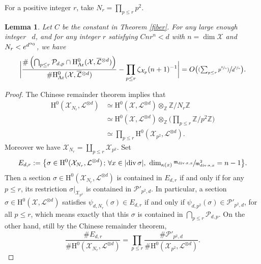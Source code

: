 \documentclass[11pt]{article}
\numberwithin{equation}{section}
\newcommand{\psfrac}[2]{\sfrac{(#1)}{#2}}
\newcommand{\sep}{\,;\,}
\theoremstyle{plain}
\newtheorem{lem}[thm]{Lemma}
\theoremstyle{definition}
\newcommand{\ho}{\mathrm{H}}
\newcommand{\m}{\mathfrak{m}}
\newcommand{\X}{\mathcal{X}}
\newcommand{\li}{\mathcal{L}}
\begin{document}
For a positive integer $r$, take $N_r=\prod_{p\leq r}p^2$.
\begin{lem}\label{many}
Let $C$ be the constant in Theorem \ref{fiber}. For any large enough integer~ $d$, and for any integer $r$ satisfying $Cnr^n<d$ with $n=\dim \X$ and $N_r<\nobreak e^{d^{\alpha_0}}$, we have
\[
\biggl| \frac{\#\left(\bigcap_{p\leq r}\mathcal{P}_{d,p}\cap \ho^0_{\mathrm{Ar}}(\X, \overline{\mathcal{L}}{}^{\otimes d})\right)}{\#\ho^0_{\mathrm{Ar}}(\X, \overline{\mathcal{L}}{}^{\otimes d})} -\prod_{p\leq r}\zeta_{\X_p}(n+1)^{-1} \biggr| =O\bigl(\psfrac{\textstyle\sum_{p\leq r}p^{\sfrac{2}{n}}}{d^{\sfrac{2}{n}}} \bigr).
\]
\end{lem}
\begin{proof}
The Chinese remainder theorem implies that
\begin{align*}
\ho^0(\X_{N_r}, \li^{\otimes d}) &\simeq  \ho^0(\X, \li^{\otimes d})\otimes_{\mathbb{Z}}\mathbb{Z}/N_r\mathbb{Z} \\
&\simeq \ho^0(\X, \li^{\otimes d})\otimes_{\mathbb{Z}}\biggl(\prod_{p\leq r}\mathbb{Z}/p^2\mathbb{Z}\biggr)\\
&\simeq \prod_{p\leq r}\ho^0(\X_{p^2}, \li^{\otimes d}).
\end{align*}
Moreover we have $\X_{N_r}=\coprod_{p\leq r}\X_{p^2}$. Set
\[
E_{d,r}:=\bigl\{ \sigma\in \ho^0(\X_{N_r}, \li^{\otimes d})\sep \forall x\in |{\div\sigma}|,\ \dim_{\kappa(x)}\sfrac{\m_{\div \sigma,x}}{\m^2_{\div \sigma, x}}=n-1 \bigr\}.
\]
Then a section $\sigma\in \ho^0(\X_{N_r}, \li^{\otimes d})$ is contained in $E_{d,r}$ if and only if for any $p\leq r$, its restriction $\sigma|_{\X_{p^2}}$ is contained in $\mathcal{P}'_{p^2,d}$. In particular, a section $\sigma \in \ho^0(\X, \li^{\otimes d})$ satisfies $\psi_{d,N_r}(\sigma)\in E_{d,r}$ if and only if $\psi_{d,p^2}(\sigma)\in \mathcal{P}'_{p^2,d}$, for all $p\leq r$, which means exactly that this $\sigma$ is contained in $ \bigcap_{p\leq r}\mathcal{P}_{d,p}$. On the other hand, still by the Chinese remainder theorem,
\[
\frac{\#E_{d,r}}{\#\ho^0(\X_{N_r}, \li^{\otimes d})}=\prod_{p\leq r} \frac{\#\mathcal{P}'_{p^2,d}}{\#\ho^0(\X_{p^2}, \li^{\otimes d})}.
\]


\end{proof}
\end{document}

